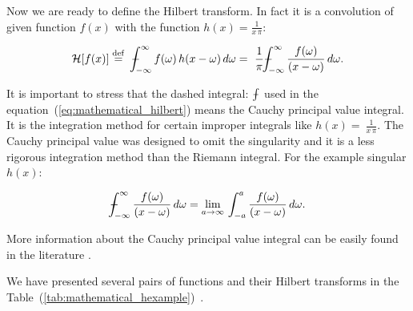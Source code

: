 \documentclass[12pt,twoside,a4paper]{article}
\numberwithin{equation}{subsection}
\numberwithin{figure}{subsection}
\def\Xint#1{\mathchoice
{\XXint\displaystyle\textstyle{#1}}%
{\XXint\textstyle\scriptstyle{#1}}%
{\XXint\scriptstyle\scriptscriptstyle{#1}}%
{\XXint\scriptscriptstyle\scriptscriptstyle{#1}}%
\!\int}
\def\XXint#1#2#3{{\setbox0=\hbox{$#1{#2#3}{\int}$ }\vcenter{\hbox{$#2#3$ }}\kern-.6\wd0}}
\def\dashint{\Xint-}
\begin{document}
Now we are ready to define the Hilbert transform. In fact it is a convolution of given function $f(x)$ with the function $h(x) =
\frac{1}{x \, \pi}$:

\begin{equation} \label{eq:mathematical_hilbert}
	\mathcal{H}[f(x)] \stackrel{\mathrm{def}}{=}
	 \ \dashint_{ - \infty }^{\infty } f(\omega) \, h(x - \omega) \, d\omega 
	=\ \frac{1}{\pi} \dashint_{ - \infty }^{\infty } \frac{f(\omega)}{(x - \omega)} \, d\omega . 
\end{equation}

It is important to stress that the dashed integral: $\dashint$ used in the equation~(\ref{eq:mathematical_hilbert}) means the Cauchy principal value integral. It is the integration method for certain improper integrals like $h(x) =\ \frac{1}{x \, \pi}$. The Cauchy principal value was designed to omit the singularity and it is a less rigorous integration method than the Riemann integral. For the example singular $ h(x) $:

\begin{equation} \label{eq:mathematical_cvp}
	\dashint_{ - \infty }^{\infty } \frac{f(\omega)}{(x - \omega)} \, d\omega = \lim_{a \to \infty}\,\int_{ - a}^{a }
	\frac{f(\omega)}{(x - \omega)} \, d\omega . 
\end{equation}

More information about the Cauchy principal value integral can be easily found in the literature \cite{henrici_applied}.

We have presented several pairs of functions and their Hilbert transforms in the Table~(\ref{tab:mathematical_hexample})~\cite{weisstein_hilbert}.
\end{document}
